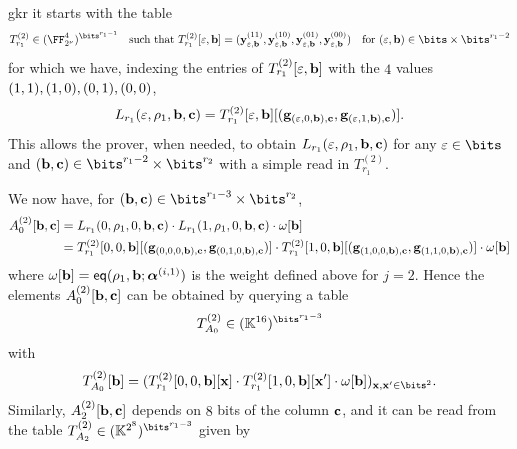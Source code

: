 \begin{lncsappendix}{gkr}
it starts with the table
%
\iflncs\begingroup\small\fi
$$
T_{r_1}^{(2)} \in (\comfield^4)^{\bits^{r_1-1}} \quad \text{such that } T_{r_1}^{(2)}[\eps,\bb] = ( \yy_{\eps,\bb}^{(11)}, \yy_{\eps,\bb}^{(10)},  \yy_{\eps,\bb}^{(01)},\yy_{\eps,\bb}^{(00)}) \quad \text{for } (\eps,\bb)\in \bits\times\bits^{r_1-2}
$$
\iflncs\endgroup\fi
for which we have, indexing the  entries of  $T_{r_1}^{(2)}[\varepsilon,\mathbf{b}]$ with the $4$ values $(1,1), (1,0), (0,1), (0,0)$,
%
$$
L_{r_1}(\varepsilon,\rho_1, \mathbf{b},\mathbf{c}) = T_{r_1}^{(2)}[\varepsilon,\mathbf{b}][(\mathbf{g}_{(\varepsilon,0,\mathbf{b}),\mathbf{c}},\mathbf{g}_{(\varepsilon,1,\mathbf{b}),\mathbf{c}})].
$$
This allows the prover, when needed, to obtain $L_{r_1}(\varepsilon,\rho_1,\mathbf{b},\mathbf{c})$ for any $\eps\in \bits$ and $(\bb,\cc)\in \bits^{r_1-2}\times \bits^{r_2}$ with a simple read in $T_{r_1}^{(2)}$.  

We now have, for $(\bb,\cc)\in \bits^{r_1-3}\times \bits^{r_2}$, 
 \iflncs\begingroup\footnotesize\fi\begin{align*}A_0^{(2)}[\mathbf{b},\mathbf{c}] &= L_{r_1}(0,\rho_1,0,\mathbf{b},\mathbf{c})\cdot L_{r_1}(1,\rho_1,0,\mathbf{b},\mathbf{c})\cdot\omega[\mathbf{b}]\\ &= 
    T_{r_1}^{(2)}[0,0,\mathbf{b}][(\mathbf{g}_{(0,0,0,\mathbf{b}),\mathbf{c}},\mathbf{g}_{(0,1,0,\mathbf{b}),\mathbf{c}})] \cdot    T_{r_1}^{(2)}[1,0,\mathbf{b}][(\mathbf{g}_{(1,0,0,\mathbf{b}),\mathbf{c}}, \mathbf{g}_{(1,1,0,\mathbf{b}),\mathbf{c}})] \cdot \omega[\mathbf{b}]
\end{align*}
\iflncs\endgroup\fi
%
where $\omega[\mathbf{b}]=\mathsf{eq}(\rho_1, \mathbf{b};\bm{\alpha}^{(i,1)})$ is the weight defined above for $j=2$.
%
Hence the elements $A_0^{(2)}[\mathbf{b},\mathbf{c}]$ can be obtained by querying a table $$T_{A_0}^{(2)}\in (\KK^{16})^{\bits^{r_1-3}}$$ with
%
$$T_{A_0}^{(2)}[\bb]= (T_{r_1}^{(2)}[0,0,\bb][\xx]\cdot T_{r_1}^{(2)}[1,0,\bb][\xx']\cdot \omega[\bb])_{\xx,\xx'\in \bits^{2}}.$$
Similarly, $A_2^{(2)}[\mathbf{b},\mathbf{c}]$ depends on $8$ bits of the column $\mathbf{c}$, and it can be read from the table $T_{A_2}^{(2)}\in(\KK^{2^8})^{\bits^{r_1-3}}$ given by

\end{lncsappendix}
